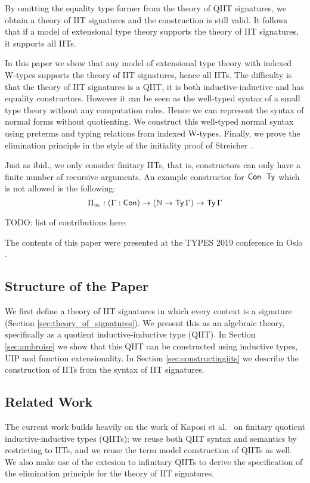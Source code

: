 \documentclass[a4paper,UKenglish,cleveref, autoref]{lipics-v2019}
\begin{document}
By omitting the equality type former from the theory of QIIT
signatures, we obtain a theory of IIT signatures and the construction
is still valid. It follows that if a model of extensional type theory
supports the theory of IIT signatures, it supports all IITs.

In this paper we show that any model of extensional type theory with
indexed W-types supports the theory of IIT signatures, hence all
IITs. The difficulty is that the theory of IIT signatures is a QIIT,
it is both inductive-inductive and has equality constructors. However
it can be seen as the well-typed syntax of a small type theory without
any computation rules. Hence we can represent the syntax of normal
forms without quotienting. We construct this well-typed normal syntax
using preterms and typing relations from indexed W-types. Finally, we
prove the elimination principle in the style of the initiality proof
of Streicher \cite{streichersemantics}.

Just as ibid., we only consider finitary IITs, that is, constructors
can only have a finite number of recursive arguments. An example
constructor for $\mathsf{Con}$--$\mathsf{Ty}$ which is not allowed is the following:
\[
  \Pi_\infty : (\Gamma : \mathsf{Con}) \rightarrow (\mathbb{N} \rightarrow \mathsf{Ty}\,\Gamma) \rightarrow \mathsf{Ty}\,\Gamma
\]

TODO: list of contributions here.

The contents of this paper were presented at the TYPES 2019 conference
in Oslo \cite{types}.

\subsection{Structure of the Paper}

We first define a theory of IIT signatures in which every context is a signature
(Section \ref{sec:theory_of_signatures}). We present this as an algebraic
\cite{ttintt} theory, specifically as a quotient inductive-inductive type
(QIIT). In Section \ref{sec:ambroise} we show that this QIIT can be constructed
using inductive types, UIP and function extensionality. In Section
\ref{sec:constructingiits} we describe the construction of IITs from the syntax
of IIT signatures.

\subsection{Related Work}

The current work builds heavily on the work of Kaposi et al.\
\cite{Kaposi:2019:CQI:3302515.3290315} on finitary quotient
inductive-inductive types (QIITs); we reuse both QIIT syntax and
semantics by restricting to IITs, and we reuse the term model
construction of QIITs as well. We also make use of the extesion to
infinitary QIITs \cite{large_inf_qiit} to derive the specification of
the elimination principle for the theory of IIT signatures.
\end{document}
